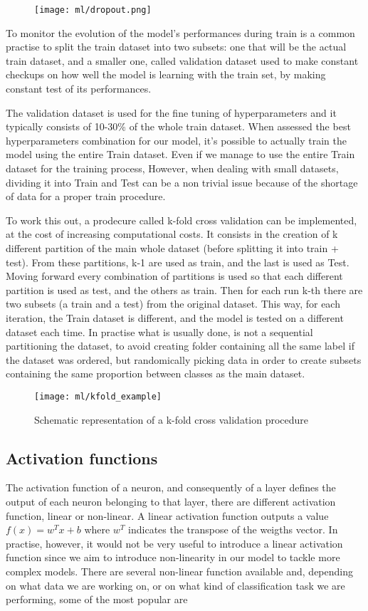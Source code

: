 \documentclass[a4paper,11pt]{article}
\begin{document}
\begin{figure}
\texttt{[image: ml/dropout.png]}
\caption{}
\label{fig:dropout}
\end{figure}


To monitor the evolution of the model's performances during train is a common practise to split the train dataset into two subsets: one that will be the actual train dataset, and a smaller one, called validation dataset used to make constant checkups on how well the model is learning with the train set, by making constant test of its performances.

The validation dataset is used for the fine tuning of hyperparameters and it typically consists of 10-30\% of the whole train dataset.
When assessed the best hyperparameters combination for our model, it's possible to actually train the model using the entire Train dataset.
Even if we manage to use the entire Train dataset for the training process,
However, when dealing with small datasets, dividing it into Train and Test can be a non trivial issue because of the shortage of data for a proper train procedure.

To work this out, a prodecure called k-fold cross validation can be implemented, at the cost of increasing computational costs.
It consists in the creation of k different partition of the main whole dataset (before splitting it into train + test).
From these partitions, k-1 are used as train, and the last is used as Test. Moving forward every combination of partitions is used so that each different partition is used as test, and the others as train.
Then for each run k-th there are two subsets (a train and a test) from the original dataset. This way, for each iteration, the Train dataset is different, and the model is tested on a different dataset each time.
In practise what is usually done, is not a sequential partitioning the dataset, to avoid creating folder containing all the same label if the dataset was ordered, but randomically picking data in order to create subsets containing the same proportion between classes as the main dataset.


\begin{figure}
\texttt{[image: ml/kfold\_example]}
\caption{Schematic representation of a k-fold cross validation procedure}
\label{fig:kfold}
\end{figure}


\subsection{Activation functions}
The activation function of a neuron, and consequently of a layer defines the output of each neuron belonging to that layer, there are different activation function, linear or non-linear.
A linear activation function outputs a value $f(x) = w^T x + b$ where $w^T$ indicates the transpose of the weigths vector.
In practise, however, it would not be very useful to introduce a linear activation function since we aim to introduce non-linearity in our model to tackle more complex models.
There are several non-linear function available and, depending on what data we are working on, or on what kind of classification task we are performing, some of the most popular are
\end{document}
